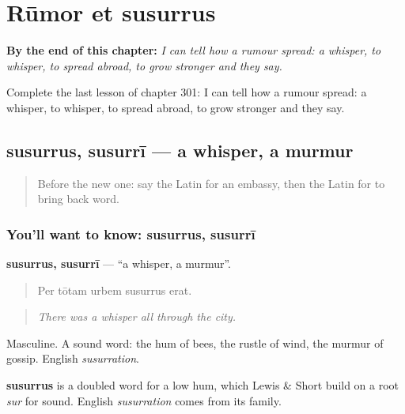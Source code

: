 
\chapter{Rūmor et susurrus}
\label{ch:la-rumor-et-susurrus}

\begin{chapteropening}
\textbf{By the end of this chapter:} \emph{I can tell how a rumour spread: a whisper, to whisper, to spread abroad, to grow stronger and they say.}

Complete the last lesson of chapter 301: I can tell how a rumour spread: a whisper, to whisper, to spread abroad, to grow stronger and they say.
\end{chapteropening}

\section[susurrus, susurrī]{susurrus, susurrī — a whisper, a murmur}

\label{lesson:LA-C301-susurrus}



\begin{quote}
Before the new one: say the Latin for an embassy, then the Latin for to bring back word.
\end{quote}

\subsection*{You'll want to know: susurrus, susurrī}
\textbf{susurrus, susurrī} — \textquotedblleft{}a whisper, a murmur\textquotedblright{}.

\begin{quote}
Per tōtam urbem susurrus erat.
\end{quote}

\begin{quote}
\emph{There was a whisper all through the city.}
\end{quote}

Masculine. A sound word: the hum of bees, the rustle of wind, the murmur of gossip. English \emph{susurration}.

\begin{cousinweb}
\textbf{susurrus} is a doubled word for a low hum, which Lewis \& Short build on a root \emph{sur} for sound. English \emph{susurration} comes from its family.
\end{cousinweb}

